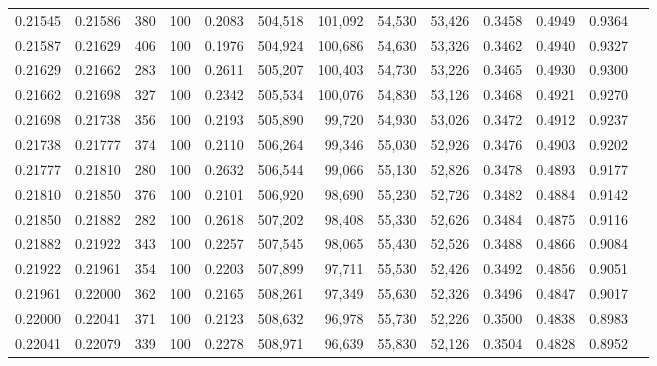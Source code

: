 \begin{tabular}{rrrrrrrrrrrrr}
0.21545 & 0.21586 &   380 & 100 &                                     0.2083 & 504,518 & 101,092 &  54,530 &  53,426 & 0.3458 & 0.4949 & 0.9364 \\
0.21587 & 0.21629 &   406 & 100 &                                     0.1976 & 504,924 & 100,686 &  54,630 &  53,326 & 0.3462 & 0.4940 & 0.9327 \\
0.21629 & 0.21662 &   283 & 100 &                                     0.2611 & 505,207 & 100,403 &  54,730 &  53,226 & 0.3465 & 0.4930 & 0.9300 \\
0.21662 & 0.21698 &   327 & 100 &                                     0.2342 & 505,534 & 100,076 &  54,830 &  53,126 & 0.3468 & 0.4921 & 0.9270 \\
0.21698 & 0.21738 &   356 & 100 &                                     0.2193 & 505,890 &  99,720 &  54,930 &  53,026 & 0.3472 & 0.4912 & 0.9237 \\
0.21738 & 0.21777 &   374 & 100 &                                     0.2110 & 506,264 &  99,346 &  55,030 &  52,926 & 0.3476 & 0.4903 & 0.9202 \\
0.21777 & 0.21810 &   280 & 100 &                                     0.2632 & 506,544 &  99,066 &  55,130 &  52,826 & 0.3478 & 0.4893 & 0.9177 \\
0.21810 & 0.21850 &   376 & 100 &                                     0.2101 & 506,920 &  98,690 &  55,230 &  52,726 & 0.3482 & 0.4884 & 0.9142 \\
0.21850 & 0.21882 &   282 & 100 &                                     0.2618 & 507,202 &  98,408 &  55,330 &  52,626 & 0.3484 & 0.4875 & 0.9116 \\
0.21882 & 0.21922 &   343 & 100 &                                     0.2257 & 507,545 &  98,065 &  55,430 &  52,526 & 0.3488 & 0.4866 & 0.9084 \\
0.21922 & 0.21961 &   354 & 100 &                                     0.2203 & 507,899 &  97,711 &  55,530 &  52,426 & 0.3492 & 0.4856 & 0.9051 \\
0.21961 & 0.22000 &   362 & 100 &                                     0.2165 & 508,261 &  97,349 &  55,630 &  52,326 & 0.3496 & 0.4847 & 0.9017 \\
0.22000 & 0.22041 &   371 & 100 &                                     0.2123 & 508,632 &  96,978 &  55,730 &  52,226 & 0.3500 & 0.4838 & 0.8983 \\
0.22041 & 0.22079 &   339 & 100 &                                     0.2278 & 508,971 &  96,639 &  55,830 &  52,126 & 0.3504 & 0.4828 & 0.8952 \\

\end{tabular}
